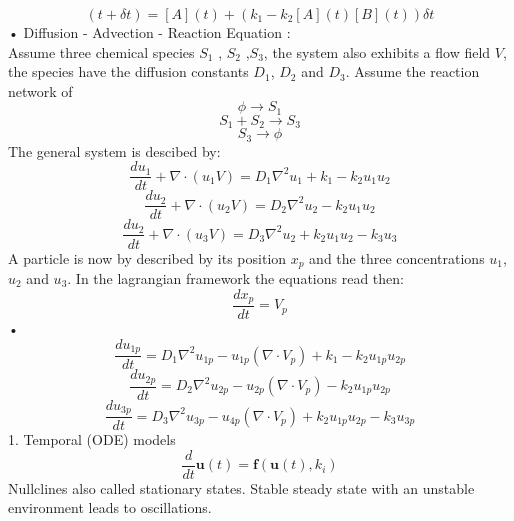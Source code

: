 \documentclass[hyperref]{labbook}
\numberwithin{equation}{experiment}
\numberwithin{table}{experiment}
\numberwithin{figure}{experiment}
\begin{document}
\begin{equation}
[A](t+\delta t ) = [A](t) + (k_1- k_2 [A](t)[B](t)) \delta t
\end{equation}• 
Diffusion - Advection - Reaction Equation :\\
Assume three chemical species $S_1$ , $S_2$ ,$S_3$, the system also exhibits a flow field $V$, the species have the diffusion constants $D_1$, $D_2$ and $D_3$. Assume the reaction network of \begin{equation}
\phi \rightarrow S_1
\end{equation}
\begin{equation}
S_1 + S_2 \rightarrow S_3
\end{equation}
\begin{equation}
S_3 \rightarrow \phi 
\end{equation}
The general system is descibed by:
\begin{equation}
\frac{du_1}{dt} + \nabla\cdot(u_1 V)  = D_1\nabla^2u_1 + k_1 - k_2u_1u_2
\end{equation}
\begin{equation}
\frac{du_2}{dt} + \nabla\cdot(u_2 V)  = D_2\nabla^2u_2 - k_2u_1u_2
\end{equation}
\begin{equation}
\frac{du_2}{dt} + \nabla\cdot(u_3 V)  = D_3\nabla^2u_2 + k_2u_1u_2- k_3u_3
\end{equation}
A particle is now by described by its position $x_p$ and the three concentrations $u_1$, $u_2$ and $u_3$. In the lagrangian framework the equations read then: 
\begin{equation}
\frac{dx_p}{dt} = V_p 
\end{equation}•
\begin{equation}
\frac{du_{1p}}{dt} = D_1\nabla^2u_{1p}- u_{1p}(\nabla\cdot V_p)   + k_1 - k_2u_{1p}u_{2p}
\end{equation}
\begin{equation}
\frac{du_{2p}}{dt} = D_2\nabla^2u_{2p} - u_{2p}(\nabla\cdot V_p)    - k_2u_{1p}u_{2p}
\end{equation}
\begin{equation}
\frac{du_{3p}}{dt} = D_3\nabla^2u_{3p} - u_{4p}(\nabla\cdot V_p)    + k_2u_{1p}u_{2p}- k_3u_{3p}
\end{equation}
1. Temporal (ODE) models
\begin{equation}
\frac{d}{dt} \mathbf u(t) = \mathbf f ( \mathbf u (t) , k_i)
\end{equation}
Nullclines also called stationary states. Stable steady state with an unstable environment leads to oscillations. 
\end{document}
